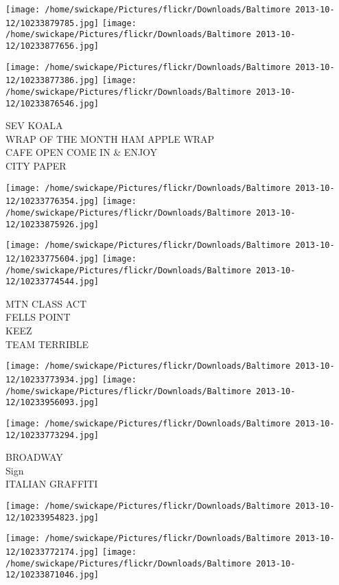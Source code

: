 \documentclass[10pt,letterpaper]{article}
\begin{document}
\texttt{[image: /home/swickape/Pictures/flickr/Downloads/Baltimore 2013-10-12/10233879785.jpg]}
\texttt{[image: /home/swickape/Pictures/flickr/Downloads/Baltimore 2013-10-12/10233877656.jpg]}

\texttt{[image: /home/swickape/Pictures/flickr/Downloads/Baltimore 2013-10-12/10233877386.jpg]}
\texttt{[image: /home/swickape/Pictures/flickr/Downloads/Baltimore 2013-10-12/10233876546.jpg]}

SEV KOALA\\
WRAP OF THE MONTH HAM APPLE WRAP\\
CAFE OPEN COME IN \& ENJOY\\
CITY PAPER
\pagebreak

\texttt{[image: /home/swickape/Pictures/flickr/Downloads/Baltimore 2013-10-12/10233776354.jpg]}
\texttt{[image: /home/swickape/Pictures/flickr/Downloads/Baltimore 2013-10-12/10233875926.jpg]}

\texttt{[image: /home/swickape/Pictures/flickr/Downloads/Baltimore 2013-10-12/10233775604.jpg]}
\texttt{[image: /home/swickape/Pictures/flickr/Downloads/Baltimore 2013-10-12/10233774544.jpg]}

MTN CLASS ACT\\
FELLS POINT\\
KEEZ\\
TEAM TERRIBLE
\pagebreak

\texttt{[image: /home/swickape/Pictures/flickr/Downloads/Baltimore 2013-10-12/10233773934.jpg]}
\texttt{[image: /home/swickape/Pictures/flickr/Downloads/Baltimore 2013-10-12/10233956093.jpg]}

\texttt{[image: /home/swickape/Pictures/flickr/Downloads/Baltimore 2013-10-12/10233773294.jpg]}

BROADWAY\\
Sign\\
ITALIAN GRAFFITI
\pagebreak

\texttt{[image: /home/swickape/Pictures/flickr/Downloads/Baltimore 2013-10-12/10233954823.jpg]}

\vspace{0.25in}
\texttt{[image: /home/swickape/Pictures/flickr/Downloads/Baltimore 2013-10-12/10233772174.jpg]}
\texttt{[image: /home/swickape/Pictures/flickr/Downloads/Baltimore 2013-10-12/10233871046.jpg]}
\end{document}

